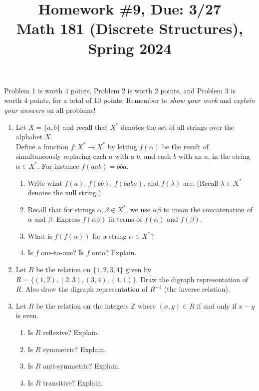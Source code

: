 \documentclass[11pt]{article}
\title{Homework \#9, Due: 3/27 \\Math 181 (Discrete Structures), Spring 2024}
\date{}
\begin{document}
\maketitle

\thispagestyle{empty}

\vspace{-1cm}

Problem 1 is worth 4 points, Problem 2 is worth 2 points, and Problem 3 is worth 4 points, for a total of 10 points. Remember to \emph{show your work} and \emph{explain your answers} on all problems!

\begin{enumerate}

\item Let $X=\{a,b\}$ and recall that $X^*$ denotes the set of all strings over the alphabet $X$. \\ Define a function $f\colon X^* \to X^*$ by letting $f(\alpha)$ be the result of simultaneously replacing each $a$ with a $b$, and each $b$ with an $a$, in the string $\alpha \in X^*$. For instance $f(aab) = bba$.
\begin{enumerate}
\item Write what $f(a)$, $f(bb)$, $f(baba)$, and $f(\lambda)$ are. (Recall $\lambda \in X^*$ denotes the null string.)
\item Recall that for strings $\alpha, \beta \in X^*$, we use $\alpha \beta$ to mean the concatenation of $\alpha$ and $\beta$. Express $f(\alpha\beta)$ in terms of $f(\alpha)$ and $f(\beta)$.
\item What is $f( f(\alpha))$ for a string $\alpha\in X^*$?
\item Is $f$ one-to-one? Is $f$ onto? Explain.
\end{enumerate}

\item Let $R$ be the relation on $\{1,2,3,4\}$ given by $R = \{(1,2),(2,3),(3,4),(4,1)\}$. Draw the digraph representation of $R$. Also draw the digraph representation of $R^{-1}$ (the inverse relation).

\item Let $R$ be the relation on the integers $\mathbb{Z}$ where $(x,y) \in R$ if and only if $x-y$ is even.
\begin{enumerate}
\item Is $R$ reflexive? Explain.
\item Is $R$ symmetric? Explain.
\item Is $R$ anti-symmetric? Explain.
\item Is $R$ transitive? Explain.
\end{enumerate}

\end{enumerate}
\end{document}
